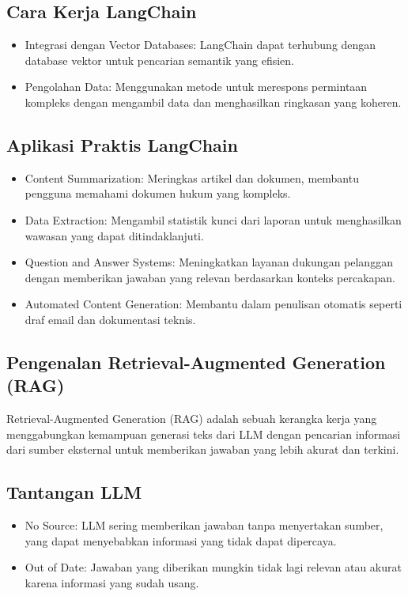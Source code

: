 \documentclass{article}
\begin{document}
\subsection{Cara Kerja LangChain}
\begin{itemize}
    \item Integrasi dengan Vector Databases: LangChain dapat terhubung dengan database vektor untuk pencarian semantik yang efisien.
    \item Pengolahan Data: Menggunakan metode untuk merespons permintaan kompleks dengan mengambil data dan menghasilkan ringkasan yang koheren.
\end{itemize}

\subsection{Aplikasi Praktis LangChain}
\begin{itemize}
    \item Content Summarization: Meringkas artikel dan dokumen, membantu pengguna memahami dokumen hukum yang kompleks.
    \item Data Extraction: Mengambil statistik kunci dari laporan untuk menghasilkan wawasan yang dapat ditindaklanjuti.
    \item Question and Answer Systems: Meningkatkan layanan dukungan pelanggan dengan memberikan jawaban yang relevan berdasarkan konteks percakapan.
    \item Automated Content Generation: Membantu dalam penulisan otomatis seperti draf email dan dokumentasi teknis.
\end{itemize}

\subsection{Pengenalan Retrieval-Augmented Generation (RAG)}
Retrieval-Augmented Generation (RAG) adalah sebuah kerangka kerja yang menggabungkan kemampuan generasi teks dari LLM dengan pencarian informasi dari sumber eksternal untuk memberikan jawaban yang lebih akurat dan terkini.

\subsection{Tantangan LLM}
\begin{itemize}
    \item No Source: LLM sering memberikan jawaban tanpa menyertakan sumber, yang dapat menyebabkan informasi yang tidak dapat dipercaya.
    \item Out of Date: Jawaban yang diberikan mungkin tidak lagi relevan atau akurat karena informasi yang sudah usang.
\end{itemize}
\end{document}
